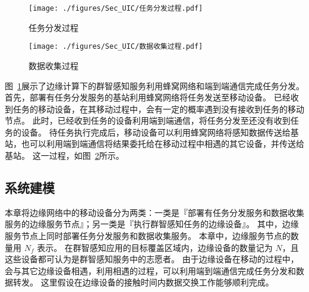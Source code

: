 \begin{figure}[!h]
  \centering
  \texttt{[image: ./figures/Sec\_UIC/任务分发过程.pdf]}
  \vspace{-1em}
  \caption{任务分发过程}
  \label{Figure_PropagationProcedure}
\end{figure}

\begin{figure}[!h]
  \centering
  \vspace{-1em}
  \texttt{[image: ./figures/Sec\_UIC/数据收集过程.pdf]}
  \vspace{-1em}
  \caption{数据收集过程}
  \vspace{-1.5em}
  \label{Figure_FeedbacksCollection}
\end{figure}

图~\ref{Figure_PropagationProcedure}展示了边缘计算下的群智感知服务利用蜂窝网络和端到端通信完成任务分发。
首先，部署有任务分发服务的基站利用蜂窝网络将任务发送至移动设备。
已经收到任务的移动设备，在其移动过程中，会有一定的概率遇到没有接收到任务的移动节点。
此时，已经收到任务的设备利用端到端通信，将任务分发至还没有收到任务的设备。
待任务执行完成后，移动设备可以利用蜂窝网络将感知数据传送给基站，也可以利用端到端通信将结果委托给在移动过程中相遇的其它设备，并传送给基站。
这一过程，如图~\ref{Figure_FeedbacksCollection}所示。

\subsection{系统建模}

本章将边缘网络中的移动设备分为两类：一类是『部署有任务分发服务和数据收集服务的边缘服务节点』；另一类是『执行群智感知任务的边缘设备』。
其中，边缘服务节点上同时部署任务分发服务和数据收集服务。
本章中，边缘服务节点的数量用 $N_f$ 表示。
在群智感知应用的目标覆盖区域内，边缘设备的数量记为 $N$，且这些设备都可认为是群智感知服务中的志愿者。
由于边缘设备在移动的过程中，会与其它边缘设备相遇，利用相遇的过程，可以利用端到端通信完成任务分发和数据转发。
这里假设在边缘设备的接触时间内数据交换工作能够顺利完成。


